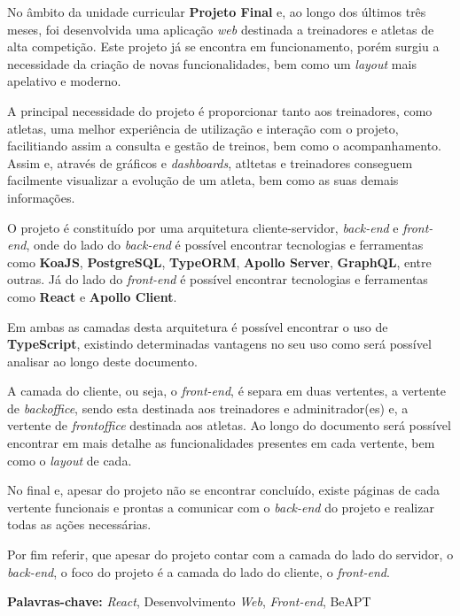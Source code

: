 
No âmbito da unidade curricular \textbf{Projeto Final} e, ao longo dos últimos três meses, foi desenvolvida uma aplicação \textit{web} destinada a treinadores e atletas de alta competição. Este projeto já se encontra em funcionamento, porém surgiu a necessidade da criação de novas funcionalidades, bem como um \textit{layout} mais apelativo e moderno.

A principal necessidade do projeto é proporcionar tanto aos treinadores, como atletas, uma melhor experiência de utilização e interação com o projeto, facilitiando assim a consulta e gestão de treinos, bem como o acompanhamento. Assim e, através de gráficos e \textit{dashboards}, atltetas e treinadores conseguem facilmente visualizar a evolução de um atleta, bem como as suas demais informações.

O projeto é constituído por uma arquitetura cliente-servidor, \textit{back-end} e \textit{front-end}, onde do lado do \textit{back-end} é possível encontrar tecnologias e ferramentas como \textbf{KoaJS}, \textbf{PostgreSQL}, \textbf{TypeORM}, \textbf{Apollo Server}, \textbf{GraphQL}, entre outras. Já do lado do \textit{front-end} é possível encontrar tecnologias e ferramentas como \textbf{React} e \textbf{Apollo Client}.

Em ambas as camadas desta arquitetura é possível encontrar o uso de \textbf{TypeScript}, existindo determinadas vantagens no seu uso como será possível analisar ao longo deste documento.

A camada do cliente, ou seja, o \textit{front-end}, é separa em duas vertentes, a vertente de \textit{backoffice}, sendo esta destinada aos treinadores e adminitrador(es) e, a vertente de \textit{frontoffice} destinada aos atletas. Ao longo do documento será possível encontrar em mais detalhe as funcionalidades presentes em cada vertente, bem como o \textit{layout} de cada.

No final e, apesar do projeto não se encontrar concluído, existe páginas de cada vertente funcionais e prontas a comunicar com o \textit{back-end} do projeto e realizar todas as ações necessárias.

Por fim referir, que apesar do projeto contar com a camada do lado do servidor, o \textit{back-end}, o foco do projeto é a camada do lado do cliente, o \textit{front-end}.

\vfill

\textbf{Palavras-chave:} \textit{React}, Desenvolvimento \textit{Web}, \textit{Front-end}, BeAPT

\newpage